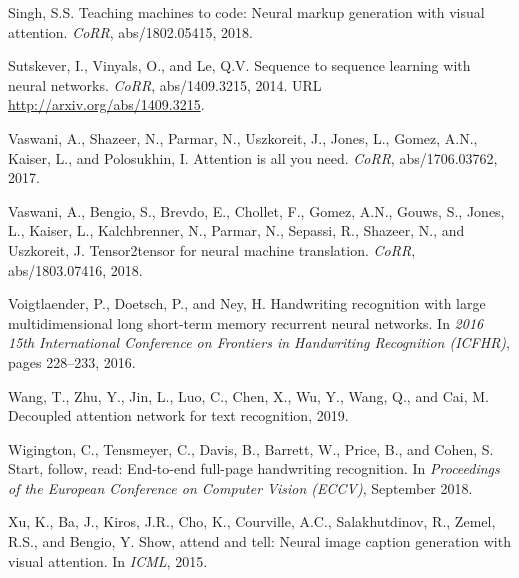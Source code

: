 \documentclass[runningheads]{llncs}
\begin{document}
\begin{thebibliography}{33}
Singh, S.S.
\newblock Teaching machines to code: Neural markup generation with visual
  attention.
\newblock \emph{CoRR}, abs/1802.05415, 2018.

Sutskever, I., Vinyals, O., and Le, Q.V.
\newblock Sequence to sequence learning with neural networks.
\newblock \emph{CoRR}, abs/1409.3215, 2014.
\newblock URL \url{http://arxiv.org/abs/1409.3215}.

Vaswani, A., Shazeer, N., Parmar, N., Uszkoreit, J., Jones, L., Gomez, A.N.,
  Kaiser, L., and Polosukhin, I.
\newblock Attention is all you need.
\newblock \emph{CoRR}, abs/1706.03762, 2017.

Vaswani, A., Bengio, S., Brevdo, E., Chollet, F., Gomez, A.N., Gouws, S.,
  Jones, L., Kaiser, L., Kalchbrenner, N., Parmar, N., Sepassi, R., Shazeer,
  N., and Uszkoreit, J.
\newblock Tensor2tensor for neural machine translation.
\newblock \emph{CoRR}, abs/1803.07416, 2018.

{Voigtlaender}, P., {Doetsch}, P., and {Ney}, H.
\newblock Handwriting recognition with large multidimensional long short-term
  memory recurrent neural networks.
\newblock In \emph{2016 15th International Conference on Frontiers in
  Handwriting Recognition (ICFHR)}, pages 228--233, 2016.

Wang, T., Zhu, Y., Jin, L., Luo, C., Chen, X., Wu, Y., Wang, Q., and Cai, M.
\newblock Decoupled attention network for text recognition, 2019.

Wigington, C., Tensmeyer, C., Davis, B., Barrett, W., Price, B., and Cohen, S.
\newblock Start, follow, read: End-to-end full-page handwriting recognition.
\newblock In \emph{Proceedings of the European Conference on Computer Vision
  (ECCV)}, September 2018.

Xu, K., Ba, J., Kiros, J.R., Cho, K., Courville, A.C., Salakhutdinov, R.,
  Zemel, R.S., and Bengio, Y.
\newblock Show, attend and tell: Neural image caption generation with visual
  attention.
\newblock In \emph{ICML}, 2015.

\end{thebibliography}
\end{document}

